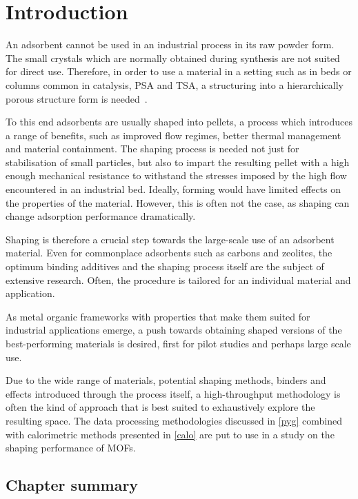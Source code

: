 
\section{Introduction}

An adsorbent cannot be used in an industrial process in its raw powder
form. The small crystals which are normally obtained during synthesis
are not suited for direct use. Therefore, in order to use a 
material in a setting such 
as in beds or columns common in catalysis, \gls{PSA} and \gls{TSA},
a structuring into a hierarchically porous structure form is 
needed~\cite{akhtarStructuringAdsorbentsCatalysts2014}.

To this end adsorbents are usually shaped into pellets, a process
which introduces a range of benefits, such as improved flow regimes,
better thermal management and material containment. The shaping process
is needed not just for stabilisation of small particles, but also to
impart the resulting pellet with a high enough mechanical resistance 
to withstand the stresses imposed by the high flow encountered in 
an industrial bed. Ideally, forming would have limited effects on
the properties of the material. However, this is often not the case, 
as shaping can change adsorption performance dramatically.

Shaping is therefore a crucial step towards the large-scale
use of an adsorbent material. Even for commonplace adsorbents such as
carbons and zeolites, the optimum binding additives and the shaping
process itself are the subject of extensive research. Often, the
procedure is tailored for an individual material and application.

As metal organic frameworks with properties that make them suited 
for industrial applications emerge, a push towards obtaining shaped
versions of the best-performing materials is desired, first for 
pilot studies and perhaps large scale use.

Due to the wide range of materials, potential shaping methods, binders 
and effects introduced through the process itself, a high-throughput
methodology is often the kind of approach that is best suited to 
exhaustively explore the resulting space. The data processing methodologies
discussed in \autoref{pyg} combined with calorimetric methods
presented in \autoref{calo} are put to use in a study on the 
shaping performance of \glspl{MOF}.

\subsection*{Chapter summary}

